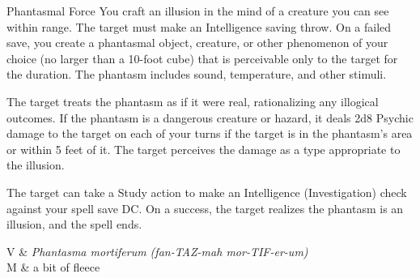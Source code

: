 \begin{Spell}[
  tags=Concentration,
  level={2nd},
  time={1 Action},
  range={60 ft/10 ft cube},
  components={V, S, M},
  duration={1 minute},
  school={Illusion},
  attack={INT Save},
  effect={Psychic}
]{Phantasmal Force}
You craft an illusion in the mind of a creature you can see within range. The target must make an Intelligence saving throw. On a failed save, you create a phantasmal object, creature, or other phenomenon of your choice (no larger than a 10-foot cube) that is perceivable only to the target for the duration. The phantasm includes sound, temperature, and other stimuli.

The target treats the phantasm as if it were real, rationalizing any illogical outcomes. If the phantasm is a dangerous creature or hazard, it deals 2d8 Psychic damage to the target on each of your turns if the target is in the phantasm's area or within 5 feet of it. The target perceives the damage as a type appropriate to the illusion.

The target can take a Study action to make an Intelligence (Investigation) check against your spell save DC. On a success, the target realizes the phantasm is an illusion, and the spell ends.

\begin{components}
V & \textit{Phantasma mortiferum (fan-TAZ-mah mor-TIF-er-um)} \\
M & a bit of fleece
\end{components}
\end{Spell}


